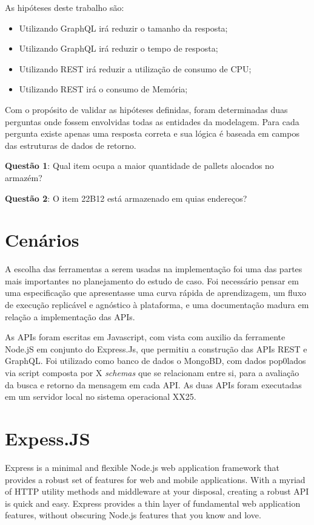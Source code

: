 As hipóteses deste trabalho são: 

\begin{itemize}
\item Utilizando GraphQL irá reduzir o tamanho da resposta;
\item Utilizando GraphQL irá reduzir o tempo de resposta;
\item Utilizando REST irá reduzir a utilização de consumo de CPU;
\item Utilizando REST irá o consumo de Memória;
\end{itemize}

Com o propósito de validar as hipóteses definidas, foram determinadas duas perguntas onde fossem envolvidas todas as entidades da modelagem. Para cada pergunta existe apenas uma resposta correta e sua lógica é baseada em campos das estruturas de dados de retorno.

\textbf{Questão 1}: Qual item ocupa a maior quantidade de pallets alocados no armazém?

\textbf{Questão 2}: O item 22B12 está armazenado em quias endereços?


\section{Cenários} \label{sec:cenarios}

A escolha das ferramentas a serem usadas na implementação foi uma das partes mais importantes no planejamento do estudo de caso. Foi necessário pensar em uma especificação que apresentasse uma curva rápida de aprendizagem, um fluxo de execução replicável e agnóstico à plataforma, e uma documentação madura em relação a implementação das APIs.

As APIs foram escritas em Javascript, com vista  com auxilio da ferramente Node.jS em conjunto do Express.Js, que permitiu a construção das APIs REST e GraphQL. Foi utilizado como banco de dados o MongoBD, com dados pop0lados via script  composta por X \textit{schemas} que se relacionam entre si, para a avaliação da busca e retorno da mensagem em cada API. As duas APIs foram executadas em um servidor local no sistema operacional XX25.

\section{Expess.JS}

Express is a minimal and flexible Node.js web application framework that provides a robust set of features for web and mobile applications. With a myriad of HTTP utility methods and middleware at your disposal, creating a robust API is quick and easy. Express provides a thin layer of fundamental web application features, without obscuring Node.js features that you know and love.

